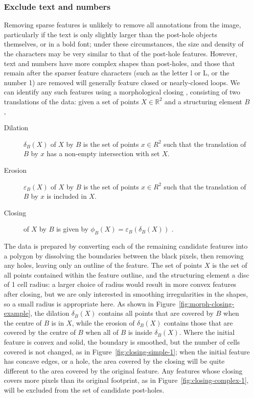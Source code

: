 \documentclass[../../ArchStats.tex]{subfiles}
\begin{document}
\subsubsection{Exclude text and numbers}
\label{sec:closing}

Removing sparse features is unlikely to remove all annotations from the image, particularly if the text is only slightly larger than the post-hole objects themselves, or in a bold font; under these circumstances, the size and density of the characters may be very similar to that of the post-hole features. However, text and numbers have more complex shapes than post-holes, and those that remain after the sparser feature characters (such as the letter l or L, or the number 1) are removed will generally feature closed or nearly-closed loops. We can identify any such features using a morphological closing \cite{Serra1983}, consisting of two translations of the data: given a set of points $X \in \mathbb{R}^2$ and a structuring element $B$,

\begin{description}
\item[Dilation] $\delta_B(X)$ of $X$ by $B$ is the set of points $x \in R^2$ such that the translation of $B$ by $x$ has a non-empty intersection with set $X$.
\vspace{-25pt}
\item[Erosion] $\varepsilon_B(X)$ of $X$ by $B$ is the set of points $x \in R^2$ such that the translation of $B$ by $x$ is included in $X$.
\vspace{-25pt}
\item[Closing] of $X$ by $B$ is given by $\phi_B(X) = \varepsilon_B(\delta_B(X))$ \cite{Vincent1997}.
\end{description}


The data is prepared by converting each of the remaining candidate features into a polygon by dissolving the boundaries between the black pixels, then removing any holes, leaving only an outline of the feature. The set of points $X$ is the set of all points contained within the feature outline, and the structuring element a disc of 1 cell radius: a larger choice of radius would result in more convex features after closing, but we are only interested in smoothing irregularities in the shapes, so a small radius is appropriate here. As shown in Figure~\ref{fig:morph-closing-example}, the dilation $\delta_B(X)$ contains all points that are covered by $B$ when the centre of $B$ is in $X$, while the erosion of $\delta_B(X)$ contains those that are covered by the centre of $B$ when all of $B$ is inside $\delta_B(X)$. Where the initial feature is convex and solid, the boundary is smoothed, but the number of cells covered is not changed, as in Figure~\ref{fig:closing-simple-1}; when the initial feature has concave edges, or a hole, the area covered by the closing will be quite different to the area covered by the original feature. Any features whose closing covers more pixels than its original footprint, as in Figure~\ref{fig:closing-complex-1}, will be excluded from the set of candidate post-holes.
\end{document}
